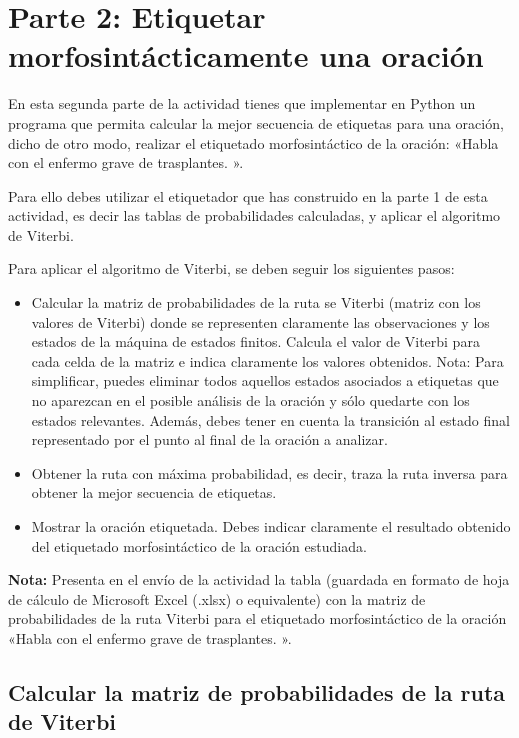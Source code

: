 \documentclass[12pt,a4paper,table]{article}
\begin{document}
    \section*{Parte 2: Etiquetar morfosintácticamente una oración}

En esta segunda parte de la actividad tienes que implementar en Python
un programa que permita calcular la mejor secuencia de etiquetas para
una oración, dicho de otro modo, realizar el etiquetado morfosintáctico
de la oración: «Habla con el enfermo grave de trasplantes. ».

Para ello debes utilizar el etiquetador que has construido en la parte 1
de esta actividad, es decir las tablas de probabilidades calculadas, y
aplicar el algoritmo de Viterbi.

Para aplicar el algoritmo de Viterbi, se deben seguir los siguientes
pasos:

\begin{itemize}
\item
  Calcular la matriz de probabilidades de la ruta se Viterbi (matriz con
  los valores de Viterbi) donde se representen claramente las
  observaciones y los estados de la máquina de estados finitos. Calcula
  el valor de Viterbi para cada celda de la matriz e indica claramente
  los valores obtenidos. Nota: Para simplificar, puedes eliminar todos
  aquellos estados asociados a etiquetas que no aparezcan en el posible
  análisis de la oración y sólo quedarte con los estados relevantes.
  Además, debes tener en cuenta la transición al estado final
  representado por el punto al final de la oración a analizar.
\item
  Obtener la ruta con máxima probabilidad, es decir, traza la ruta
  inversa para obtener la mejor secuencia de etiquetas.
\item
  Mostrar la oración etiquetada. Debes indicar claramente el resultado
  obtenido del etiquetado morfosintáctico de la oración estudiada.
\end{itemize}

\textbf{Nota:} Presenta en el envío de la actividad la tabla (guardada
en formato de hoja de cálculo de Microsoft Excel (.xlsx) o equivalente)
con la matriz de probabilidades de la ruta Viterbi para el etiquetado
morfosintáctico de la oración «Habla con el enfermo grave de
trasplantes. ».

    \hypertarget{calcular-la-matriz-de-probabilidades-de-la-ruta-de-viterbi}{%
\subsection*{Calcular la matriz de probabilidades de la ruta de
Viterbi}\label{calcular-la-matriz-de-probabilidades-de-la-ruta-de-viterbi}}
\end{document}

